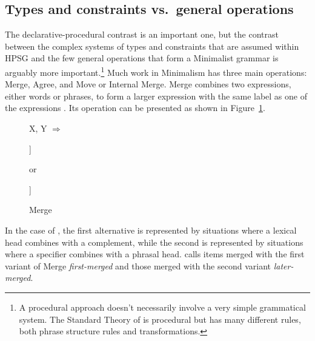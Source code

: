 \documentclass[output=paper,biblatex,babelshorthands,newtxmath,draftmode,colorlinks,citecolor=brown]{langscibook}
\begin{document}


\subsection{Types and constraints vs.\ general operations}
\label{sec-types-vs-operations}\label{minimalism:sec-types-vs-operations}

The declarative-procedural contrast is an important one, but the contrast between the complex
systems of types and constraints that are assumed within HPSG and the few general operations that
form a Minimalist grammar is arguably more important.\footnote{%
  A procedural approach doesn't necessarily involve a very simple grammatical system. The Standard
  Theory of  \citep{Chomsky65a} is procedural but has many different rules,
  both phrase structure rules and transformations.}
Much work in Minimalism has three main operations: Merge, Agree, and Move or Internal Merge. Merge
combines two expressions, either words or phrases, to form a larger expression with the same label
as one of the expressions \parencites[244]{Chomsky95a-u}[]{Chomsky2008a}. Its operation can be presented as shown in Figure~\ref{fig:min-merge}.
\begin{figure}
\centering
	X, Y $\Rightarrow$
	\hspace{1em}
	\begin{forest} %
		[X [X,baseline] [Y]]
	\end{forest}
\hspace{1em}
{or}
\hspace{1em}
	\begin{forest} %
		[Y [X,baseline] [Y]]
	\end{forest}
	\caption{\label{fig:min-merge}Merge}
\end{figure}
In the case of , the first alternative is represented by situations where a lexical head
combines with a complement, while the second is represented by situations where a specifier combines
with a phrasal head. \citet[]{Chomsky2008a} calls items merged with the first variant of Merge \emph{first-merged}
and those merged with the second variant \emph{later-merged}.
\end{document}
